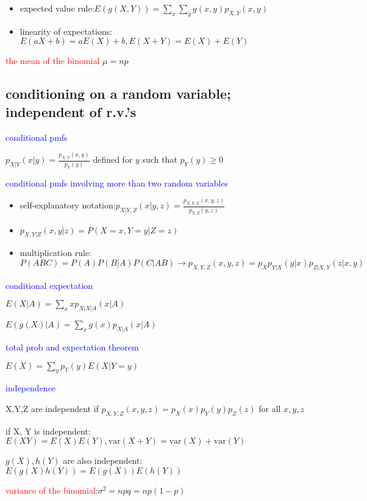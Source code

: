 \begin{itemize}
    \item expected value rule:$E(g(X,Y))=\sum_x\sum_y g(x,y)p_{X,Y}(x,y)$
    \item linearity of expectations:$E(aX+b)=aE(X)+b,E(X+Y)=E(X)+E(Y)$
\end{itemize}


\textcolor{red}{the mean of the binomial}
$\mu=np$







\subsection*{conditioning on a random variable; independent of r.v.'s}


\textcolor{blue}{conditional pmfs}

$p_{X|Y}(x|y)=\frac{p_{X,Y}(x,y)}{p_Y(y)}$ defined for $y$ such that $p_Y(y)\ge 0$

\textcolor{blue}{conditional pmfs involving more than two random variables}

\begin{itemize}
    \item self-explanatory notation:$p_{X|Y,Z}(x|y,z)=\frac{p_{X,Y,Z}(x,y,z)}{p_{Y,Z}(y,z)}$
    \item $p_{X,Y|Z}(x,y|z)=P(X=x,Y=y|Z=z)$
    \item multiplication rule: $P(ABC)=P(A)P(B|A)P(C|AB)\rightarrow p_{X,Y,Z}(x,y,z)=p_Xp_{Y|X}(y|x)p_{Z|X,Y}(z|x,y)$  
\end{itemize}

\textcolor{blue}{conditional expectation}

$E(X|A)=\sum_x x p_{X|X|A}(x|A)$

$E(g(X)|A)=\sum_x g(x) p_{X|A}(x|A)$


\textcolor{blue}{total prob and expectation theorem}

$E(X)=\sum_y p_Y(y)E(X|Y=y)$

\textcolor{blue}{independence}

X,Y,Z are independent if $p_{X,Y,Z}(x,y,z)=p_X(x)p_Y(y)p_Z(z)$  for all $x,y,z$

if X, Y is independent:$E(XY)=E(X)E(Y),\text{var}(X+Y)=\text{var}(X)+\text{var}(Y)$

$g(X), h(Y)$ are also independent:$E(g(X)h(Y))=E(g(X))E(h(Y))$


\textcolor{red}{variance of the binomial}:$\sigma^2 = npq=np(1-p)$


